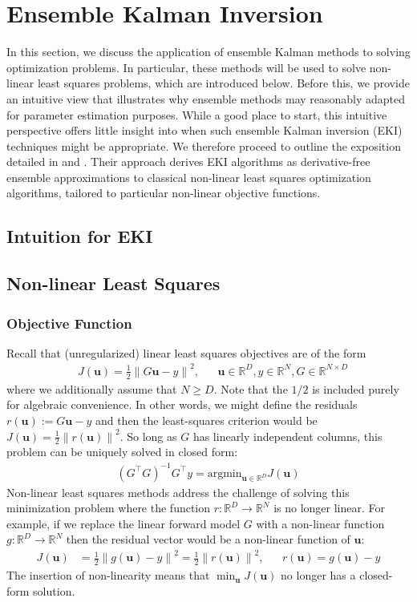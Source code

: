 \documentclass[12pt]{article}
\newcommand{\bpar}{\mathbf{u}} %
\newcommand*{\norm}[1]{\left\lVert#1\right\rVert}
\newcommand{\R}{\mathbb{R}}
\begin{document}
\section{Ensemble Kalman Inversion}
In this section, we discuss the application of ensemble Kalman methods to solving optimization problems. In particular, these methods will be used 
to solve non-linear least squares problems, which are introduced below. Before this, we provide an intuitive view that illustrates why ensemble methods 
may reasonably adapted for parameter estimation purposes. While a good place to start, this intuitive perspective offers little insight into when such 
ensemble Kalman inversion (EKI) techniques might be appropriate. We therefore proceed to outline the exposition detailed in \cite{Chada} and 
\cite{IPDA}. Their approach derives EKI algorithms as derivative-free ensemble approximations to classical non-linear least squares optimization algorithms, tailored 
to particular non-linear objective functions. 

\subsection{Intuition for EKI}

\subsection{Non-linear Least Squares}

\subsubsection{Objective Function}
Recall that (unregularized) linear least squares objectives are of the form 
\begin{align*}
&J(\bpar) = \frac{1}{2} \norm{G\bpar - y}^2, && \bpar \in \R^D, y \in \R^N, G \in \R^{N \times D}
\end{align*}
where we additionally assume that $N \geq D$. Note that the $1/2$ is included purely for algebraic convenience. 
In other words, we might define the residuals $r(\bpar) := G\bpar - y$ and then the least-squares criterion would be $J(\bpar) = \frac{1}{2} \norm{r(\bpar)}^2$. So long as $G$ has linearly independent columns, this 
problem can be uniquely solved in closed form:
\begin{align}
(G^\top G)^{-1} G^\top y = \text{argmin}_{\bpar \in \R^D} J(\bpar) \label{linear_LS}
\end{align}
Non-linear least squares methods address the challenge of solving this minimization problem where the function $r: \R^D \to \R^N$ is no longer linear. For example, if we replace the linear forward 
model $G$ with a non-linear function $g: \R^D \to \R^N$ then the residual vector would be a non-linear function of $\bpar$:
\begin{align*}
J(\bpar) &= \frac{1}{2} \norm{g(\bpar) - y}^2 = \frac{1}{2} \norm{r(\bpar)}^2, && r(\bpar) = g(\bpar) - y
\end{align*}
The insertion of non-linearity means that $\min_{\bpar} J(\bpar)$ no longer has a closed-form solution. 
\end{document}
